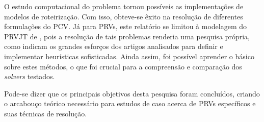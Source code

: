 O estudo computacional do problema tornou possíveis as implementações de modelos de roteirização. Com isso, obteve-se êxito na resolução de diferentes formulações do PCV. Já para PRVs, este relatório se limitou à modelagem do PRVJT de \textcite{VIEIRA:13}, pois a resolução de tais problemas renderia uma pesquisa própria, como indicam os grandes esforços dos artigos analisados para definir e implementar heurísticas sofisticadas. Ainda assim, foi possível aprender o básico sobre estes métodos, o que foi crucial para a compreensão e comparação dos \emph{solvers} testados.

Pode-se dizer que os principais objetivos desta pesquisa foram concluídos, criando o arcabouço teórico necessário para estudos de caso acerca de PRVs específicos e suas técnicas de resolução.